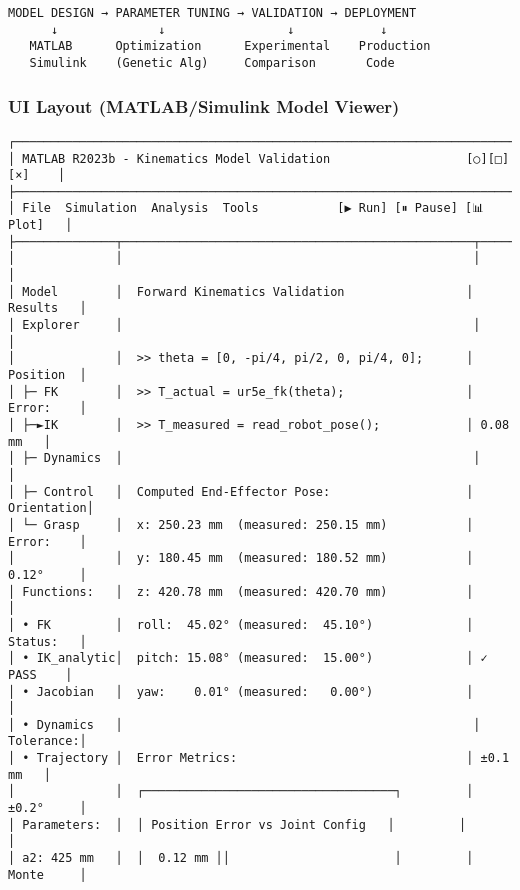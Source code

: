 \documentclass[
]{article}
\begin{document}
\begin{verbatim}
MODEL DESIGN → PARAMETER TUNING → VALIDATION → DEPLOYMENT
      ↓              ↓                 ↓            ↓
   MATLAB      Optimization      Experimental    Production
   Simulink    (Genetic Alg)     Comparison       Code
\end{verbatim}

\hypertarget{ui-layout-matlabsimulink-model-viewer}{%
\subsubsection{UI Layout (MATLAB/Simulink Model
Viewer)}\label{ui-layout-matlabsimulink-model-viewer}}

\begin{verbatim}
┌────────────────────────────────────────────────────────────────────────────┐
│ MATLAB R2023b - Kinematics Model Validation                   [○][□][×]    │
├────────────────────────────────────────────────────────────────────────────┤
│ File  Simulation  Analysis  Tools           [▶ Run] [⏸ Pause] [📊 Plot]   │
├──────────────┬─────────────────────────────────────────────────┬───────────┤
│              │                                                 │           │
│ Model        │  Forward Kinematics Validation                 │ Results   │
│ Explorer     │                                                 │           │
│              │  >> theta = [0, -pi/4, pi/2, 0, pi/4, 0];      │ Position  │
│ ├─ FK        │  >> T_actual = ur5e_fk(theta);                 │ Error:    │
│ ├─►IK        │  >> T_measured = read_robot_pose();            │ 0.08 mm   │
│ ├─ Dynamics  │                                                 │           │
│ ├─ Control   │  Computed End-Effector Pose:                   │ Orientation│
│ └─ Grasp     │  x: 250.23 mm  (measured: 250.15 mm)           │ Error:    │
│              │  y: 180.45 mm  (measured: 180.52 mm)           │ 0.12°     │
│ Functions:   │  z: 420.78 mm  (measured: 420.70 mm)           │           │
│ • FK         │  roll:  45.02° (measured:  45.10°)             │ Status:   │
│ • IK_analytic│  pitch: 15.08° (measured:  15.00°)             │ ✓ PASS    │
│ • Jacobian   │  yaw:    0.01° (measured:   0.00°)             │           │
│ • Dynamics   │                                                 │ Tolerance:│
│ • Trajectory │  Error Metrics:                                │ ±0.1 mm   │
│              │  ┌───────────────────────────────────┐         │ ±0.2°     │
│ Parameters:  │  │ Position Error vs Joint Config   │         │           │
│ a2: 425 mm   │  │  0.12 mm ││                       │         │ Monte     │

\end{verbatim}
\end{document}
